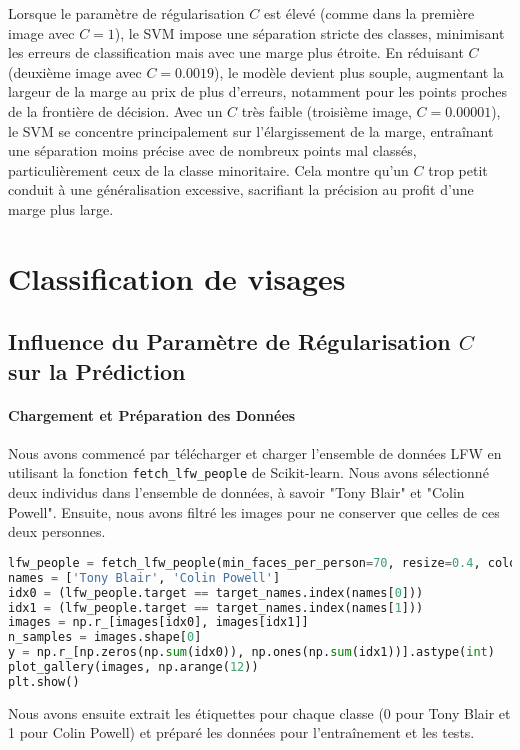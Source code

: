 \documentclass[12pt,a4paper]{report}
\begin{document}
Lorsque le paramètre de régularisation \( C \) est élevé (comme dans la première image avec \( C = 1 \)), le SVM impose une séparation stricte des classes, minimisant les erreurs de classification mais avec une marge plus étroite. En réduisant \( C \) (deuxième image avec \( C = 0.0019 \)), le modèle devient plus souple, augmentant la largeur de la marge au prix de plus d'erreurs, notamment pour les points proches de la frontière de décision. Avec un \( C \) très faible (troisième image, \( C = 0.00001 \)), le SVM se concentre principalement sur l'élargissement de la marge, entraînant une séparation moins précise avec de nombreux points mal classés, particulièrement ceux de la classe minoritaire. Cela montre qu'un \( C \) trop petit conduit à une généralisation excessive, sacrifiant la précision au profit d'une marge plus large.

\section{Classification de visages}
\subsection{Influence du Paramètre de Régularisation \( C \)
 sur la Prédiction}
\paragraph{Chargement et Préparation des Données\\}
Nous avons commencé par télécharger et charger l'ensemble de données LFW en utilisant la fonction \texttt{fetch\_lfw\_people} de Scikit-learn. Nous avons sélectionné deux individus dans l'ensemble de données, à savoir "Tony Blair" et "Colin Powell". Ensuite, nous avons filtré les images pour ne conserver que celles de ces deux personnes.

\begin{lstlisting}[language=Python, caption=Chargement des données et prétraitement]
lfw_people = fetch_lfw_people(min_faces_per_person=70, resize=0.4, color=True)
names = ['Tony Blair', 'Colin Powell']
idx0 = (lfw_people.target == target_names.index(names[0]))
idx1 = (lfw_people.target == target_names.index(names[1]))
images = np.r_[images[idx0], images[idx1]]
n_samples = images.shape[0]
y = np.r_[np.zeros(np.sum(idx0)), np.ones(np.sum(idx1))].astype(int)
plot_gallery(images, np.arange(12))
plt.show()
\end{lstlisting}

Nous avons ensuite extrait les étiquettes pour chaque classe (0 pour Tony Blair et 1 pour Colin Powell) et préparé les données pour l'entraînement et les tests.
\end{document}
